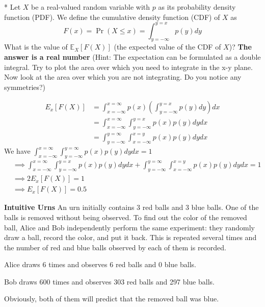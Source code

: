\documentclass[solution,addpoints,12pt]{exam}
\begin{document}
\begin{questions}
\question ** Let $X$ be a real-valued random variable with $p$ as its probability density function (PDF). We define the cumulative density function (CDF) of $X$ as 
\[
    F(x) = \Pr(X \leq x) = \int_{y = -\infty}^{y = x} p(y) dy
\]
What is the value of $\mathbb{E}_X[F(X)]$ (the expected value of the CDF of $X$)? \textbf{The answer is a real number} (Hint: The expectation can be formulated as a double integral. Try to plot the area over which you need to integrate in the x-y plane. Now look at the area over which you are not integrating. Do you notice any symmetries?)
\begin{solution}
	\begin{align*}
		E_x[F(X)] &= \int_{x = -\infty}^{x = \infty} p(x) \left( \int_{y = -\infty}^{y = x} p(y) dy \right) dx\\
				&= \int_{x = -\infty}^{x = \infty} \int_{y = -\infty}^{y = x} p(x) p(y) dy dx \\
				&= \int_{y = -\infty}^{y = \infty} \int_{x = -\infty}^{x = y} p(x) p(y) dy dx
	\end{align*}
	We have $\int_{x = -\infty}^{x = \infty} \int_{y = -\infty}^{y = \infty} p(x) p(y) dy dx = 1$
	\begin{align*}
		& \implies \int_{x = -\infty}^{x = \infty} \int_{y = -\infty}^{y = x} p(x) p(y) dy dx + \int_{y = -\infty}^{y = \infty} \int_{x = -\infty}^{x = y} p(x) p(y) dy dx = 1 \\
		& \implies 2 E_x[F(X)] = 1 \\
		& \implies E_x[F(X)] = 0.5
	\end{align*}
\end{solution}

\question * \textbf{Intuitive Urns}
\newline
An urn initially contains 3 red balls and 3 blue balls. One of the balls is removed without being observed. To find out the color of the removed ball, Alice and Bob independently perform the same experiment: they randomly draw a ball, record the color, and put it back. This is repeated several times and the number of red and blue balls observed by each of them is recorded.

Alice draws 6 times and observes 6 red balls and 0 blue balls.

Bob draws 600 times and observes 303 red balls and 297 blue balls.

Obviously, both of them will predict that the removed ball was blue.

\begin{parts}
    

\end{parts}
\end{questions}
\end{document}
